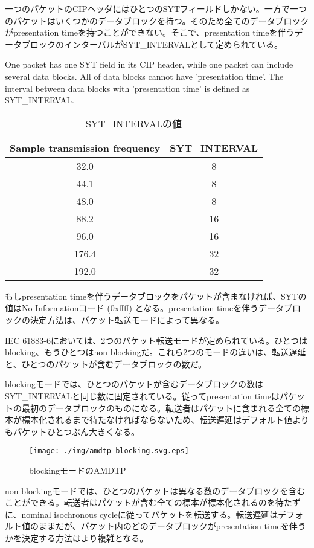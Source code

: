 \documentclass[onecolumn]{jarticle}
\begin{document}
一つのパケットのCIPヘッダにはひとつのSYTフィールドしかない。一方で一つのパケットはいくつかのデータブロックを持つ。そのため全てのデータブロックがpresentation timeを持つことができない。そこで、presentation timeを伴うデータブロックのインターバルがSYT\_INTERVALとして定められている。


One packet has one SYT field in its CIP header, while one packet can include several data blocks. All of data blocks cannot have 'presentation time'. The interval between data blocks with 'presentation time' is defined as SYT\_INTERVAL.

\begin{table}[ht]
	\centering
	\caption{{SYT\_INTERVALの値}}
	\label{syt_interval}
	\begin{tabular}{cc} \toprule
		Sample transmission frequency & SYT\_INTERVAL \\ \midrule
		32.0	& 8	\\
		44.1	& 8	\\
		48.0	& 8	\\
		88.2	& 16	\\
		96.0	& 16	\\
		176.4	& 32	\\
		192.0	& 32	\\ \bottomrule
	\end{tabular}
\end{table}

もしpresentation timeを伴うデータブロックをパケットが含まなければ、SYTの値はNo Informationコード (0xffff) となる。presentation timeを伴うデータブロックの決定方法は、パケット転送モードによって異なる。

IEC 61883-6\cite{iec61883-6-1,iec61883-6-2}においては、2つのパケット転送モードが定められている。ひとつはblocking、もうひとつはnon-blockingだ。これら2つのモードの違いは、転送遅延と、ひとつのパケットが含むデータブロックの数だ。

blockingモードでは、ひとつのパケットが含むデータブロックの数はSYT\_INTERVALと同じ数に固定されている。従ってpresentation timeはパケットの最初のデータブロックのものになる。転送者はパケットに含まれる全ての標本が標本化されるまで待たなければならないため、転送遅延はデフォルト値よりもパケットひとつぶん大きくなる。


\begin{figure}[H]
	\centering
	\texttt{[image: ./img/amdtp-blocking.svg.eps]}
	\caption{{blockingモードのAMDTP}}
	\label{amdtp-blocking}
\end{figure}

non-blockingモードでは、ひとつのパケットは異なる数のデータブロックを含むことができる。転送者はパケットが含む全ての標本が標本化されるのを待たずに、nominal isochronous cycleに従ってパケットを転送する。転送遅延はデフォルト値のままだが、パケット内のどのデータブロックがpresentation timeを伴うかを決定する方法はより複雑となる。
\end{document}
